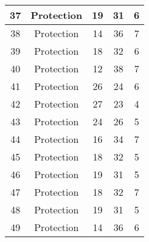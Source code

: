 \documentclass[results.tex]{subfiles}
\begin{document}
\begin{center}
\begin{tabular}{| c || c | c | c | c |}
            \hline
            37                      & Protection                   & 19                     & 31                      & 6                    \\
            \hline
            38                      & Protection                   & 14                     & 36                      & 7                    \\
            \hline
            39                      & Protection                   & 18                     & 32                      & 6                    \\
            \hline
            40                      & Protection                   & 12                     & 38                      & 7                    \\
            \hline
            41                      & Protection                   & 26                     & 24                      & 6                    \\
            \hline
            42                      & Protection                   & 27                     & 23                      & 4                    \\
            \hline
            43                      & Protection                   & 24                     & 26                      & 5                    \\
            \hline
            44                      & Protection                   & 16                     & 34                      & 7                    \\
            \hline
            45                      & Protection                   & 18                     & 32                      & 5                    \\
            \hline
            46                      & Protection                   & 19                     & 31                      & 5                    \\
            \hline
            47                      & Protection                   & 18                     & 32                      & 7                    \\
            \hline
            48                      & Protection                   & 19                     & 31                      & 5                    \\
            \hline
            49                      & Protection                   & 14                     & 36                      & 6                    \\
            \hline
        \end{tabular}
    \end{center}
\end{document}
